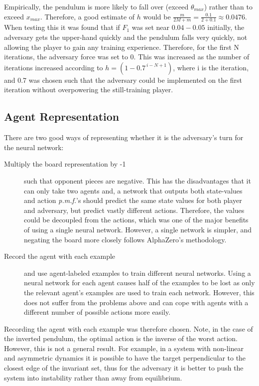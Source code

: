 \documentclass[../main.tex]{subfiles}
\begin{document}
Empirically, the pendulum is more likely to fall over (exceed $\theta_{max}$) rather than to exceed $x_{max}$. Therefore, a good estimate of $h$ would be $\frac{m}{2M+m} = \frac{0.1}{2+0.1} \approx 0.0476$. When testing this it was found that if $F_1$ was set near $0.04-0.05$ initially, the adversary gets the upper-hand quickly and the pendulum falls very quickly, not allowing the player to gain any training experience. Therefore, for the first N iterations, the adversary force was set to 0. This was increased as the number of iterations increased according to $h = (1-0.7^{\,i-N+1})$, where i is the iteration, and 0.7 was chosen such that the adversary could be implemented on the first iteration without overpowering the still-training player.

\newpage
\subsection{Agent Representation}

There are two good ways of representing whether it is the adversary's turn for the neural network: 
\begin{description}
   \item[Multiply the board representation by -1] such that opponent pieces are negative. This has the disadvantages that it can only take two agents and, a network that outputs both state-values and action \textit{p.m.f.}'s should predict the same state values for both player and adversary, but predict vastly different actions. Therefore, the values could be decoupled from the actions, which was one of the major benefits of using a single neural network. However, a single network is simpler, and negating the board more closely follows AlphaZero's methodology.

   \item[Record the agent with each example] and use agent-labeled examples to train different neural networks. Using a neural network for each agent causes half of the examples to be lost as only the relevant agent's examples are used to train each network. However, this does not suffer from the problems above and can cope with agents with a different number of possible actions more easily.
\end{description}

Recording the agent with each example was therefore chosen. Note, in the case of the inverted pendulum, the optimal action is the inverse of the worst action. However, this is not a general result. For example, in a system with non-linear and asymmetric dynamics it is possible to have the target perpendicular to the closest edge of the invariant set, thus for the adversary it is better to push the system into instability rather than away from equilibrium.
\end{document}
